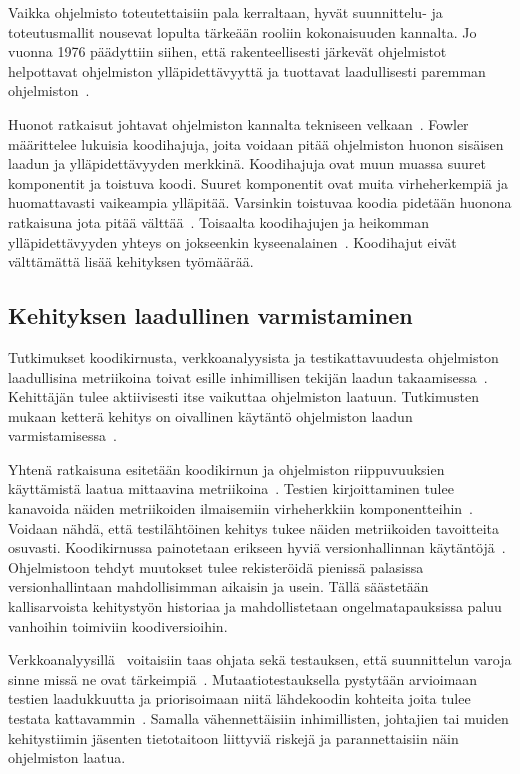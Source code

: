 \documentclass[finnish]{../tktltiki2}
\theoremstyle{definition}
\theoremstyle{remark}
\begin{document}
    Vaikka ohjelmisto toteutettaisiin pala kerraltaan, hyvät suunnittelu- ja toteutusmallit nousevat lopulta tärkeään 
rooliin kokonaisuuden kannalta. Jo vuonna 1976 päädyttiin siihen, että rakenteellisesti järkevät ohjelmistot helpottavat 
ohjelmiston ylläpidettävyyttä ja tuottavat laadullisesti paremman ohjelmiston~\cite{LK76}.

    Huonot ratkaisut johtavat ohjelmiston kannalta tekniseen velkaan~\cite{FFS12}. Fowler määrittelee lukuisia 
koodihajuja, joita voidaan pitää ohjelmiston huonon sisäisen laadun ja ylläpidettävyyden merkkinä. Koodihajuja ovat muun 
muassa suuret komponentit ja toistuva koodi. Suuret komponentit ovat muita virheherkempiä ja huomattavasti vaikeampia 
ylläpitää. Varsinkin toistuvaa koodia pidetään huonona ratkaisuna jota pitää välttää~\cite{FFS12}. Toisaalta 
koodihajujen ja heikomman ylläpidettävyyden yhteys on jokseenkin kyseenalainen~\cite{SYAMD12}. Koodihajut eivät 
välttämättä lisää kehityksen työmäärää.

\subsection{Kehityksen laadullinen varmistaminen}

Tutkimukset koodikirnusta, verkkoanalyysista ja testikattavuudesta ohjelmiston laadullisina metriikoina toivat esille 
inhimillisen tekijän laadun takaamisessa~\cite{NB05, ZN08, MNDT09}. Kehittäjän tulee aktiivisesti itse vaikuttaa 
ohjelmiston laatuun. Tutkimusten mukaan ketterä kehitys on oivallinen käytäntö ohjelmiston laadun 
varmistamisessa~\cite{SS10}.

    Yhtenä ratkaisuna esitetään koodikirnun ja ohjelmiston riippuvuuksien käyttämistä laatua mittaavina 
metriikoina~\cite{NB05, NB07}. Testien kirjoittaminen tulee kanavoida näiden metriikoiden ilmaisemiin virheherkkiin 
komponentteihin~\cite{MNDT09}. Voidaan nähdä, että testilähtöinen kehitys tukee näiden metriikoiden tavoitteita 
osuvasti. Koodikirnussa painotetaan erikseen hyviä versionhallinnan käytäntöjä~\cite{NB05}. Ohjelmistoon tehdyt 
muutokset tulee rekisteröidä pienissä palasissa versionhallintaan mahdollisimman aikaisin ja usein. Tällä säästetään 
kallisarvoista kehitystyön historiaa ja mahdollistetaan ongelmatapauksissa paluu vanhoihin toimiviin koodiversioihin.

    Verkkoanalyysillä~\cite{ZN08} voitaisiin taas ohjata sekä testauksen, että suunnittelun varoja sinne missä ne ovat 
tärkeimpiä~\cite{NB07, MNDT09}. Mutaatiotestauksella pystytään arvioimaan testien laadukkuutta ja priorisoimaan niitä 
lähdekoodin kohteita joita tulee testata kattavammin~\cite{YH11}. Samalla vähennettäisiin inhimillisten, johtajien tai 
muiden kehitystiimin jäsenten tietotaitoon liittyviä riskejä ja parannettaisiin näin ohjelmiston laatua.
\end{document}
